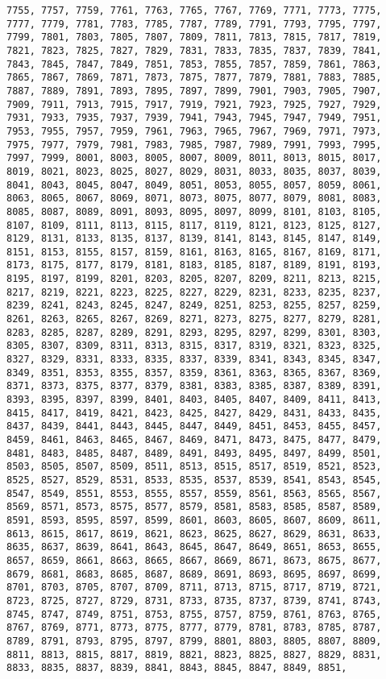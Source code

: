 \documentclass[11pt]{article}
\begin{document}
\begin{Verbatim}[commandchars=\\\{\}]
7755, 7757, 7759, 7761, 7763, 7765, 7767, 7769, 7771, 7773, 7775, 7777, 7779, 7781, 7783, 7785, 7787, 7789, 7791, 7793, 7795, 7797, 7799, 7801, 7803, 7805, 7807, 7809, 7811, 7813, 7815, 7817, 7819, 7821, 7823, 7825, 7827, 7829, 7831, 7833, 7835, 7837, 7839, 7841, 7843, 7845, 7847, 7849, 7851, 7853, 7855, 7857, 7859, 7861, 7863, 7865, 7867, 7869, 7871, 7873, 7875, 7877, 7879, 7881, 7883, 7885, 7887, 7889, 7891, 7893, 7895, 7897, 7899, 7901, 7903, 7905, 7907, 7909, 7911, 7913, 7915, 7917, 7919, 7921, 7923, 7925, 7927, 7929, 7931, 7933, 7935, 7937, 7939, 7941, 7943, 7945, 7947, 7949, 7951, 7953, 7955, 7957, 7959, 7961, 7963, 7965, 7967, 7969, 7971, 7973, 7975, 7977, 7979, 7981, 7983, 7985, 7987, 7989, 7991, 7993, 7995, 7997, 7999, 8001, 8003, 8005, 8007, 8009, 8011, 8013, 8015, 8017, 8019, 8021, 8023, 8025, 8027, 8029, 8031, 8033, 8035, 8037, 8039, 8041, 8043, 8045, 8047, 8049, 8051, 8053, 8055, 8057, 8059, 8061, 8063, 8065, 8067, 8069, 8071, 8073, 8075, 8077, 8079, 8081, 8083, 8085, 8087, 8089, 8091, 8093, 8095, 8097, 8099, 8101, 8103, 8105, 8107, 8109, 8111, 8113, 8115, 8117, 8119, 8121, 8123, 8125, 8127, 8129, 8131, 8133, 8135, 8137, 8139, 8141, 8143, 8145, 8147, 8149, 8151, 8153, 8155, 8157, 8159, 8161, 8163, 8165, 8167, 8169, 8171, 8173, 8175, 8177, 8179, 8181, 8183, 8185, 8187, 8189, 8191, 8193, 8195, 8197, 8199, 8201, 8203, 8205, 8207, 8209, 8211, 8213, 8215, 8217, 8219, 8221, 8223, 8225, 8227, 8229, 8231, 8233, 8235, 8237, 8239, 8241, 8243, 8245, 8247, 8249, 8251, 8253, 8255, 8257, 8259, 8261, 8263, 8265, 8267, 8269, 8271, 8273, 8275, 8277, 8279, 8281, 8283, 8285, 8287, 8289, 8291, 8293, 8295, 8297, 8299, 8301, 8303, 8305, 8307, 8309, 8311, 8313, 8315, 8317, 8319, 8321, 8323, 8325, 8327, 8329, 8331, 8333, 8335, 8337, 8339, 8341, 8343, 8345, 8347, 8349, 8351, 8353, 8355, 8357, 8359, 8361, 8363, 8365, 8367, 8369, 8371, 8373, 8375, 8377, 8379, 8381, 8383, 8385, 8387, 8389, 8391, 8393, 8395, 8397, 8399, 8401, 8403, 8405, 8407, 8409, 8411, 8413, 8415, 8417, 8419, 8421, 8423, 8425, 8427, 8429, 8431, 8433, 8435, 8437, 8439, 8441, 8443, 8445, 8447, 8449, 8451, 8453, 8455, 8457, 8459, 8461, 8463, 8465, 8467, 8469, 8471, 8473, 8475, 8477, 8479, 8481, 8483, 8485, 8487, 8489, 8491, 8493, 8495, 8497, 8499, 8501, 8503, 8505, 8507, 8509, 8511, 8513, 8515, 8517, 8519, 8521, 8523, 8525, 8527, 8529, 8531, 8533, 8535, 8537, 8539, 8541, 8543, 8545, 8547, 8549, 8551, 8553, 8555, 8557, 8559, 8561, 8563, 8565, 8567, 8569, 8571, 8573, 8575, 8577, 8579, 8581, 8583, 8585, 8587, 8589, 8591, 8593, 8595, 8597, 8599, 8601, 8603, 8605, 8607, 8609, 8611, 8613, 8615, 8617, 8619, 8621, 8623, 8625, 8627, 8629, 8631, 8633, 8635, 8637, 8639, 8641, 8643, 8645, 8647, 8649, 8651, 8653, 8655, 8657, 8659, 8661, 8663, 8665, 8667, 8669, 8671, 8673, 8675, 8677, 8679, 8681, 8683, 8685, 8687, 8689, 8691, 8693, 8695, 8697, 8699, 8701, 8703, 8705, 8707, 8709, 8711, 8713, 8715, 8717, 8719, 8721, 8723, 8725, 8727, 8729, 8731, 8733, 8735, 8737, 8739, 8741, 8743, 8745, 8747, 8749, 8751, 8753, 8755, 8757, 8759, 8761, 8763, 8765, 8767, 8769, 8771, 8773, 8775, 8777, 8779, 8781, 8783, 8785, 8787, 8789, 8791, 8793, 8795, 8797, 8799, 8801, 8803, 8805, 8807, 8809, 8811, 8813, 8815, 8817, 8819, 8821, 8823, 8825, 8827, 8829, 8831, 8833, 8835, 8837, 8839, 8841, 8843, 8845, 8847, 8849, 8851, 
\end{Verbatim}
\end{document}
